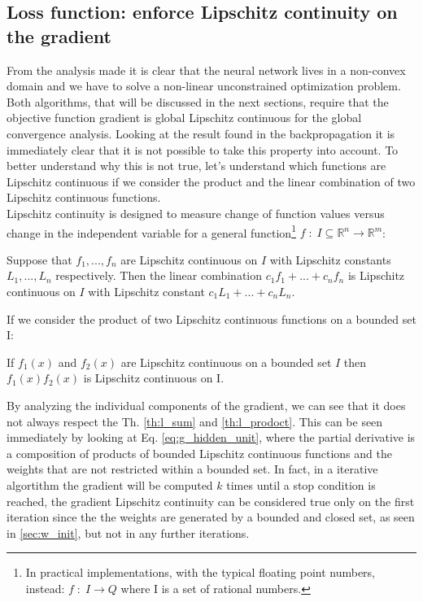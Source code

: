 \subsection{Loss function: enforce Lipschitz continuity on the gradient}
\label{sec:l_lips_g}
From the analysis made it is clear that the neural network lives in a non-convex domain and we have to solve a non-linear unconstrained optimization problem. Both algorithms, that will be discussed in the next sections, require that the objective function gradient is global Lipschitz continuous for the global convergence analysis. Looking at the result found in the backpropagation it is immediately clear that it is not possible to take this property into account. 
To better understand why this is not true, let's understand which functions are Lipschitz continuous if we consider the product and the linear combination of two Lipschitz continuous functions.\\

Lipschitz continuity is designed to measure change of function values versus change in the independent variable for a general function\footnote{In practical implementations, with the typical floating point numbers, instead: $f \;:\; I \rightarrow Q$ where I is a set of rational numbers.} $f \;:\; I \subseteq \mathbb{R}^n \rightarrow \mathbb{R}^m$:
\begin{theorem}
\label{th:l_sum}
Suppose that $f_1,..., f_n$ are Lipschitz continuous on $I$ with Lipschitz constants  $L_1 , ... , L_n$ respectively. Then the linear combination $c_1f_1 +...+c_nf_n$ is Lipschitz continuous on $I$ with Lipschitz constant $c_1L_1 +...+ c_nL_n$.
\end{theorem}
\noindent If we consider the product of two Lipschitz continuous functions on a bounded set I:
\begin{theorem}
\label{th:l_prodoct}
If $f_1(x)$ and $f_2(x)$ are Lipschitz continuous on a bounded set $I$ then $f_1(x)f_2(x)$ is Lipschitz continuous on I.
\end{theorem}
\noindent By analyzing the individual components of the gradient, we can see that it does not always respect the Th. \ref{th:l_sum} and \ref{th:l_prodoct}. This can be seen immediately by looking at Eq. \ref{eq:g_hidden_unit}, where the partial derivative is a composition of products of bounded Lipschitz continuous functions and the weights that are not restricted within a bounded set. In fact, in a iterative algortithm the gradient will be computed $k$ times until a stop condition is reached, the gradient Lipschitz continuity can be considered true only on the first iteration since the the weights are generated by a bounded and closed set, as seen in \ref{sec:w_init}, but not in any further iterations.\\

